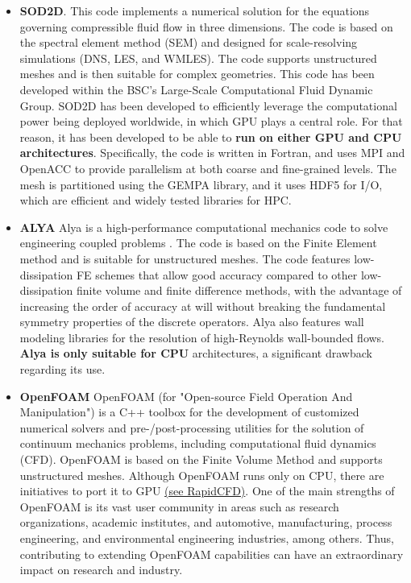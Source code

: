 \documentclass{article}
\begin{document}
\begin{itemize}
\item {\bf SOD2D}. This code implements a numerical solution for the equations governing compressible fluid flow in three dimensions. The code is based on the spectral element method (SEM) and designed for scale-resolving simulations (DNS, LES, and WMLES). The code supports unstructured meshes and is then suitable for complex geometries. This code has been developed within the BSC's Large-Scale Computational Fluid Dynamic Group. SOD2D has been developed to efficiently leverage the computational power being deployed worldwide, in which GPU plays a central role. For that reason, it has been developed to be able to {\bf run on either GPU and CPU architectures}. Specifically, the code is written in Fortran, and uses MPI and OpenACC to provide parallelism at both coarse and fine-grained levels. The mesh is partitioned using the GEMPA library, and it uses HDF5 for I/O, which are efficient and widely tested libraries for HPC.

\item {\bf ALYA} Alya is a high-performance computational mechanics code to solve engineering coupled problems \cite{HOU09}. The code is based on the Finite Element method and is suitable for unstructured meshes. The code features low-dissipation FE schemes that allow good accuracy compared to other low-dissipation finite volume and finite difference methods, with the advantage of increasing the order of accuracy at will without breaking the fundamental symmetry properties of the discrete operators. Alya also features wall modeling libraries for the resolution of high-Reynolds wall-bounded flows. {\bf Alya is only suitable for CPU} architectures, a significant drawback regarding its use. 

\item {\bf OpenFOAM} OpenFOAM (for "Open-source Field Operation And Manipulation") is a C++ toolbox for the development of customized numerical solvers and pre-/post-processing utilities for the solution of continuum mechanics problems, including computational fluid dynamics (CFD). OpenFOAM is based on the Finite Volume Method and supports unstructured meshes. Although OpenFOAM runs only on CPU, there are initiatives to port it to GPU \href{https://sim-flow.com/rapid-cfd-gpu/}{(see RapidCFD)}. One of the main strengths of OpenFOAM is its vast user community in areas such as research organizations, academic institutes, and automotive, manufacturing, process engineering, and environmental engineering industries, among others. Thus, contributing to extending OpenFOAM capabilities can have an extraordinary impact on research and industry. 

\end{itemize}
\end{document}
